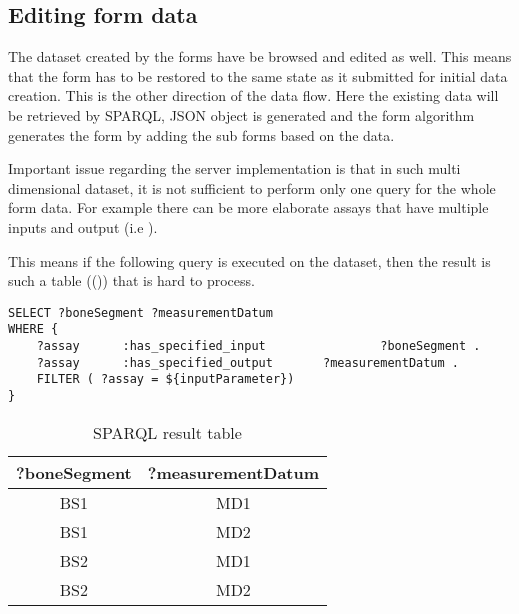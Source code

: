 \subsection{Editing form data}
	
	
The dataset created by the forms have be browsed and edited as well. This means that the form has to be restored to the same state as it submitted for initial data creation. This is the other direction of the data flow. Here the existing data will be retrieved by SPARQL, JSON object is generated and the form algorithm generates the form by adding the sub forms based on the data.



Important issue regarding the server implementation is that in such multi dimensional dataset, it is not sufficient to perform only one query for the whole form data. For example there can be more elaborate assays that have multiple inputs and output (i.e ).



This means if the following query is executed on the dataset, then the result is such a table (()) that is hard to process.

\begin{lstlisting}[captionpos=b, caption=SPARQL query for the form data, label={sparqlExisting},
basicstyle=\footnotesize,frame=single]
SELECT ?boneSegment ?measurementDatum
WHERE {
	?assay		:has_specified_input				?boneSegment .
	?assay		:has_specified_output       ?measurementDatum .
	FILTER ( ?assay = ${inputParameter})
}
\end{lstlisting}


\begin{table}
	\begin{center}
		\begin{tabular}{||c | c||} 
			\hline
			?boneSegment & ?measurementDatum  \\ [0.5ex] 
			\hline\hline
			BS1 & MD1 \\ 
			\hline
			BS1 & MD2 \\ 
			\hline
			BS2 & MD1 \\ 
			\hline
			BS2 & MD2 \\  [1ex] 
			\hline 
		\end{tabular}
	\end{center}
	\caption{SPARQL result table}  \label{sparqlResult}
\end{table}


